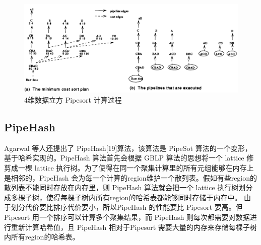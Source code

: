 \begin{figure}[!htb]
\centering\includegraphics[width=5.5in]{picture/ch_current_research/pipesort} 
\caption{4维数据立方 Pipesort 计算过程}\label{pipesort} 
\end{figure} 

\subsection{PipeHash}

Agarwal 等人还提出了 PipeHash[19]算法，该算法是 PipeSot 算法的一个变形，基于哈希实现的。PipeHash 算法首先会根据 GBLP 算法的思想将一个 lattice 修剪成一棵 lattice 执行树。为了使得在同一个聚集计算里的所有元组能够在内存上是相邻的，PipeHash 会为每一个计算的region维护一个散列表。假如有些region的散列表不能同时存放在内存里，则 PipeHash 算法就会把一个 lattice 执行树划分成多棵子树，使得每棵子树内所有region的哈希表都能够同时存储于内存中。 由于划分代价要比排序代价要小，所以PipeHash 的性能要比 Pipesort 要高。但 Pipesort 用一个排序可以计算多个聚集结果，而 PipeHash 则每次都需要对数据进行重新计算哈希值，且 PipeHash 相对于Pipesort 需要大量的内存来存储每棵子树内所有region的哈希表。



